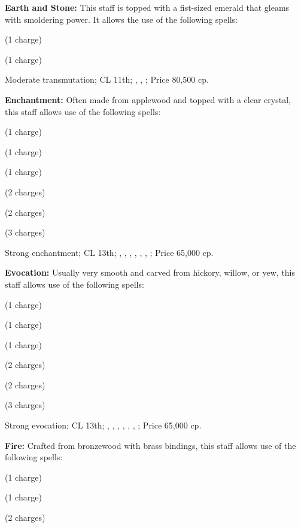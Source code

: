 \textbf{Earth and Stone:} This staff is topped with a fist-sized emerald that gleams with smoldering power. It allows the use of the following spells:
\begin{itemize*}
\item {} (1 charge)
\item {} (1 charge)
\end{itemize*}

Moderate transmutation; CL 11th; , , ; Price 80,500 cp.

\textbf{Enchantment:} Often made from applewood and topped with a clear crystal, this staff allows use of the following spells:
\begin{itemize*}
\item {} (1 charge)
\item {} (1 charge)
\item {} (1 charge)
\item {} (2 charges)
\item {} (2 charges)
\item {} (3 charges)
\end{itemize*}

Strong enchantment; CL 13th; , , , , , , ; Price 65,000 cp.

\textbf{Evocation:} Usually very smooth and carved from hickory, willow, or yew, this staff allows use of the following spells:
\begin{itemize*}
\item {} (1 charge)
\item {} (1 charge)
\item {} (1 charge)
\item {} (2 charges)
\item {} (2 charges)
\item {} (3 charges)
\end{itemize*}

Strong evocation; CL 13th; , , , , , , ; Price 65,000 cp.

\textbf{Fire:} Crafted from bronzewood with brass bindings, this staff allows use of the following spells:
\begin{itemize*}
\item {} (1 charge)
\item {} (1 charge)
\item {} (2 charges)
\end{itemize*}

